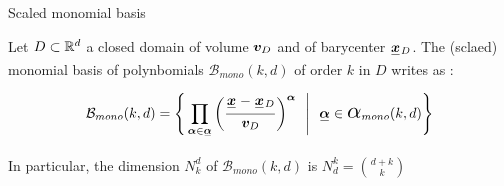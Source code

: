 \documentclass[fleqn]{article}
\newcommand{\Domain}{
  D
}
\begin{document}
        \begin{defbox}{Scaled monomial basis}

          Let $\Domain \subset \Rd$ a closed domain of volume $\tensoro{v}_{\Domain}$ and of barycenter $\tensori{x} \subscript{\Domain}$. The (sclaed) monomial basis of polynbomials $\mathcal{B}_{mono}(k, d)$ of order $k$ in $\Domain$ writes as :

          \begin{equation}
            \mathcal{B}_{mono}(k, d) =
            \Bigg\{
              \prod_{\tensoro{\alpha} \in \scriptize{\tensori{\alpha}}}
              {\left(
                \frac{\tensori{x} - \tensori{x} \subscript{\Domain}}{\tensoro{v}_{\Domain}}
              \right)}^{\tensoro{\alpha}}
              \ \ \Bigg\vert \ \ 
              \tensori{\alpha} \in \captize{\alpha}_{mono}(k,d)
            \Bigg\}
          \end{equation}

          In particular, the dimension $N_k^d$ of $\mathcal{B}_{mono}(k, d)$ is $N_d^k = \binom{d+k}{k}$

        \end{defbox}

    

  
  
\end{document}
